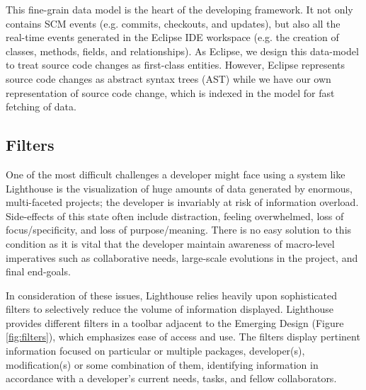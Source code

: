 \documentclass[10pt, conference, compsocconf]{IEEEtran}
\begin{document}
This fine-grain data model is the heart of the developing framework. It not only contains SCM events (e.g. commits, checkouts, and updates), but also all the real-time events generated in the Eclipse IDE workspace (e.g. the creation of classes, methods, fields, and relationships).  As Eclipse, we design this data-model to treat source code changes as first-class entities. However, Eclipse represents source code changes as abstract syntax trees (AST) while we have our own representation of source code change, which is indexed in the model for fast fetching of data. 

\subsection{Filters}

One of the most difficult challenges a developer might face using a system like Lighthouse is the visualization of huge amounts of data generated by enormous, multi-faceted projects; the developer is invariably at risk of information overload.  Side-effects of this state often include distraction, feeling overwhelmed, loss of focus/specificity, and loss of purpose/meaning.  There is no easy solution to this condition as it is vital that the developer maintain awareness of macro-level imperatives such as collaborative needs, large-scale evolutions in the project, and final end-goals.  

\begin{figure*}[!t]
 \centering
 \hfil
{}
\caption{Example of the modification filter being applied to the Emerging Design view.}
\label{fig:filters}
\end{figure*}

In consideration of these issues, Lighthouse relies heavily upon sophisticated filters to selectively reduce the volume of information displayed.  Lighthouse provides different filters in a toolbar adjacent to the Emerging Design (Figure \ref{fig:filters}), which emphasizes ease of access and use.  The filters display pertinent information focused on particular or multiple packages, developer(s), modification(s) or some combination of them, identifying information in accordance with a developer's current needs, tasks, and fellow collaborators.  
\end{document}
